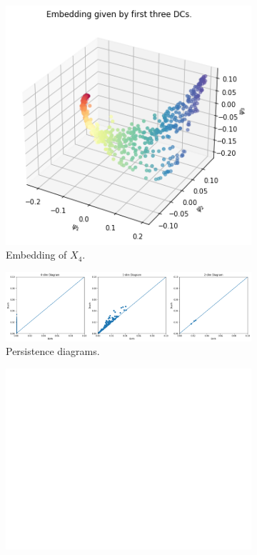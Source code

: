 \begin{figure}[H]
\centering
\begin{subfigure}[b]{0.2\textwidth}
    \includegraphics[width=\textwidth]{figures/topology/X4_embedding.png}
    \caption{Embedding of  $X_4$.}
\end{subfigure}
\hfill
\begin{subfigure}[b]{0.75\textwidth}
    \includegraphics[width=\textwidth]{figures/topology/X4_H0.png}
    \caption{Persistence diagrams.}
\end{subfigure}
\begin{subfigure}[b]{0.25\textwidth}
\includegraphics[width=\textwidth]{figures/topology/white.png} 

\end{subfigure}
\end{figure}
